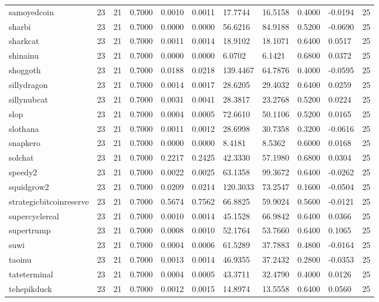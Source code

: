 \begin{table}[htbp]
\begin{tabular}{lllllllllll}
samoyedcoin & 23 & 21 & 0.7000 & 0.0010 & 0.0011 & 17.7744 & 16.5158 & 0.4000 & -0.0194 & 25 \\
sharbi & 23 & 21 & 0.7000 & 0.0000 & 0.0000 & 56.6216 & 84.9188 & 0.5200 & -0.0690 & 25 \\
sharkcat & 23 & 21 & 0.7000 & 0.0011 & 0.0014 & 18.9102 & 18.1071 & 0.6400 & 0.0517 & 25 \\
shinainu & 23 & 21 & 0.7000 & 0.0000 & 0.0000 & 6.0702 & 6.1421 & 0.6800 & 0.0372 & 25 \\
shoggoth & 23 & 21 & 0.7000 & 0.0188 & 0.0218 & 139.4467 & 64.7876 & 0.4000 & -0.0595 & 25 \\
sillydragon & 23 & 21 & 0.7000 & 0.0014 & 0.0017 & 28.6205 & 29.4032 & 0.6400 & 0.0259 & 25 \\
sillynubcat & 23 & 21 & 0.7000 & 0.0031 & 0.0041 & 28.3817 & 23.2768 & 0.5200 & 0.0224 & 25 \\
slop & 23 & 21 & 0.7000 & 0.0004 & 0.0005 & 72.6610 & 50.1106 & 0.5200 & 0.0165 & 25 \\
slothana & 23 & 21 & 0.7000 & 0.0011 & 0.0012 & 28.6998 & 30.7358 & 0.3200 & -0.0616 & 25 \\
snapkero & 23 & 21 & 0.7000 & 0.0000 & 0.0000 & 8.4181 & 8.5362 & 0.6000 & 0.0168 & 25 \\
solchat & 23 & 21 & 0.7000 & 0.2217 & 0.2425 & 42.3330 & 57.1980 & 0.6800 & 0.0304 & 25 \\
speedy2 & 23 & 21 & 0.7000 & 0.0022 & 0.0025 & 63.1358 & 99.3672 & 0.6400 & -0.0262 & 25 \\
squidgrow2 & 23 & 21 & 0.7000 & 0.0209 & 0.0214 & 120.3033 & 73.2547 & 0.1600 & -0.0504 & 25 \\
strategicbitcoinreserve & 23 & 21 & 0.7000 & 0.5674 & 0.7562 & 66.8825 & 59.9024 & 0.5600 & -0.0121 & 25 \\
supercyclereal & 23 & 21 & 0.7000 & 0.0010 & 0.0014 & 45.1528 & 66.9842 & 0.6400 & 0.0366 & 25 \\
supertrump & 23 & 21 & 0.7000 & 0.0008 & 0.0010 & 52.1764 & 53.7660 & 0.6400 & 0.1065 & 25 \\
suwi & 23 & 21 & 0.7000 & 0.0004 & 0.0006 & 61.5289 & 37.7883 & 0.4800 & -0.0164 & 25 \\
taoinu & 23 & 21 & 0.7000 & 0.0013 & 0.0014 & 46.9355 & 37.2432 & 0.2800 & -0.0353 & 25 \\
tateterminal & 23 & 21 & 0.7000 & 0.0004 & 0.0005 & 43.3711 & 32.4790 & 0.4000 & 0.0126 & 25 \\
tehepikduck & 23 & 21 & 0.7000 & 0.0012 & 0.0015 & 14.8974 & 13.5558 & 0.6400 & 0.0560 & 25 \\

\end{tabular}
\end{table}
